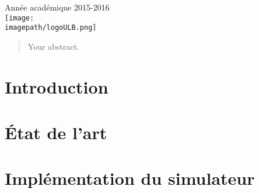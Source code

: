 \begin{titlepage}


{\large Année académique 2015-2016}\\[2cm] %


\texttt{[image: \\imagepath/logoULB.png]}\\[1cm] %
 

\vfill %

\end{titlepage}

\renewcommand{\cftsecleader}{\cftdotfill{\cftdotsep}}
\tableofcontents
\newpage

\pagestyle{fancy}

\setlength\headheight{15pt}
\renewcommand{\sectionmark}[1]{\markright{ #1}}
\renewcommand{\headrulewidth}{0.5pt}
\pagestyle{fancy}
\fancyhead[C]{} 
\fancyhead[RO]{\rightmark}
\fancyfoot[C]{}

\begin{abstract}
Your abstract.
\end{abstract}

\section{Introduction}
\section{État de l'art}
\section{Implémentation du simulateur}
